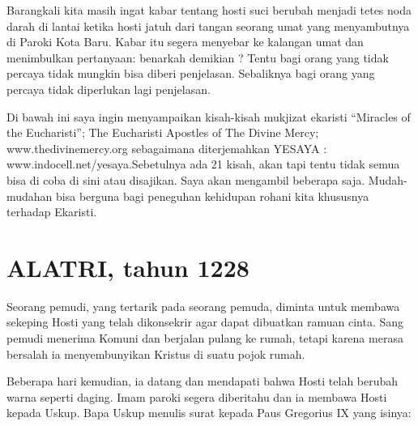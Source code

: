 \small
    Barangkali kita masih ingat kabar tentang hosti suci berubah menjadi tetes noda darah di lantai ketika hosti jatuh dari tangan seorang umat yang menyambutnya di Paroki Kota Baru.  Kabar itu segera menyebar ke kalangan umat dan menimbulkan pertanyaan:  benarkah demikian ? Tentu bagi orang yang tidak percaya tidak mungkin bisa diberi penjelasan. Sebaliknya bagi orang yang percaya tidak diperlukan lagi penjelasan.

    Di bawah ini saya ingin menyampaikan kisah-kisah mukjizat ekaristi ``Miracles of the Eucharisti''; The Eucharisti Apostles of The Divine Mercy; www.thedivinemercy.org sebagaimana diterjemahkan YESAYA : www.indocell.net/yesaya.Sebetulnya ada 21 kisah, akan tapi tentu tidak semua bisa di coba di sini atau disajikan. Saya akan mengambil beberapa saja. Mudah-mudahan bisa berguna bagi peneguhan kehidupan rohani kita khususnya terhadap Ekaristi.
\normalsize
 

\renewcommand{\thesection}{\arabic{section}.}

\section{ALATRI, tahun 1228}

Seorang pemudi, yang tertarik pada seorang pemuda, diminta untuk membawa sekeping Hosti yang telah dikonsekrir agar dapat dibuatkan ramuan cinta. Sang pemudi menerima Komuni dan berjalan pulang ke rumah, tetapi karena merasa bersalah ia menyembunyikan Kristus di suatu pojok rumah.

Beberapa hari kemudian, ia datang dan mendapati bahwa Hosti telah berubah warna seperti daging. Imam paroki segera diberitahu dan ia membawa Hosti kepada Uskup. Bapa Uskup menulis surat kepada Paus Gregorius IX yang isinya:
\small
{}
\normalsize

